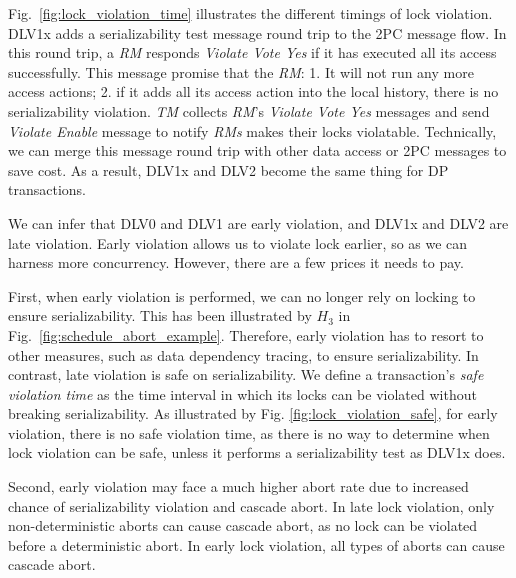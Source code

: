 \documentclass[conference]{IEEEtran}
\begin{document}
Fig.~\ref{fig:lock_violation_time} illustrates the different timings of lock violation.
DLV1x adds a serializability test message round trip to the 2PC message flow.
In this round trip, a \emph{RM} responds \emph{Violate Vote Yes} if it has executed all its access successfully.
This message promise that the \emph{RM}: 1. It will not run any more access actions; 2. if it adds all its access action into the local history, there is no serializability violation.
\emph{TM} collects \emph{RM}'s \emph{Violate Vote Yes} messages and send \emph{Violate Enable} message to notify \emph{RMs} makes their locks violatable.
Technically, we can merge this message round trip with other data access or 2PC messages to save cost.
As a result, DLV1x and DLV2 become the same thing for DP transactions.


We can infer that DLV0 and DLV1 are early violation, and DLV1x and DLV2 are late violation.
Early violation allows us to violate lock earlier, so as we can harness more concurrency. However, there are a few prices it needs to pay.

First, when early violation is performed, we can no longer rely on locking to ensure serializability. This has been illustrated by ${H_3}$ in Fig.~\ref{fig:schedule_abort_example}.
Therefore, early violation has to resort to other measures, such as data dependency tracing, to ensure serializability.
In contrast, late violation is safe on serializability.
We define a transaction's \emph{safe violation time} as the time interval in which its locks can be violated without breaking serializability.
As illustrated by Fig. \ref{fig:lock_violation_safe},
for early violation, there is no safe violation time, as there is no way to determine when lock violation can be safe, unless it performs a serializability test as DLV1x does.

Second, early violation may face a much higher abort rate due to increased chance of serializability violation and cascade abort.
In late lock violation, only non-deterministic aborts can cause cascade abort, as no lock can be violated before a deterministic abort.
In early lock violation, all types of aborts can cause cascade abort.
\end{document}
